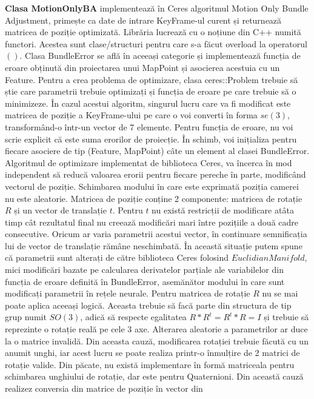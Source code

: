 \documentclass[12pt,a4paper]{report}
\begin{document}
\textbf{Clasa MotionOnlyBA} implementează în Ceres algoritmul Motion Only Bundle Adjustment,
primește ca date de intrare KeyFrame-ul curent și returnează matricea de poziție optimizată.
Librăria lucrează cu o noțiune din C++ numită functori. Acestea sunt clase/structuri pentru
care s-a făcut overload la operatorul $ () $. Clasa BundleError se află în aceeași categorie
și implementează funcția de eroare obținută din proiectarea unui MapPoint și asocierea 
acestuia cu un Feature. Pentru a crea problema de optimizare, clasa ceres::Problem trebuie 
să știe care parametrii trebuie optimizați și funcția de eroare pe care trebuie să o minimizeze.
În cazul acestui algoritm, singurul lucru care va fi modificat este matricea de poziție a KeyFrame-ului
pe care o voi converti în forma $ se(3) $, transformând-o într-un vector de 7 elemente. Pentru 
funcția de eroare, nu voi scrie explicit că este suma erorilor de proiecție. În schimb, voi inițializa pentru
fiecare asociere de tip (Feature, MapPoint) câte un element al clasei BundleError. Algoritmul de 
optimizare implementat de biblioteca Ceres, va încerca în mod independent să reducă valoarea erorii 
pentru fiecare pereche în parte, modificând vectorul de poziție. Schimbarea modului în care este 
exprimată poziția camerei nu este aleatorie. Matricea de poziție conține 2 componente:
matricea de rotație $ R $ și un vector de translație $ t $. Pentru $ t $ nu există restricții 
de modificare atâta timp cât rezultatul final nu creează modificări mari între pozițiile a două cadre
consecutive. Oricum ar varia parametrii acestui vector, în continuare semnificația
lui de vector de translație rămâne neschimbată. În această situație putem spune că parametrii 
sunt alterați de către biblioteca Ceres folosind $ EuclidianManifold $, mici modificări bazate pe
calcularea derivatelor parțiale ale variabilelor din funcția de eroare definită în BundleError, asemănător 
modului în care sunt modificați parametrii în rețele neurale. Pentru matricea de rotație $ R $ nu se 
mai poate aplica aceeași logică. Aceasta trebuie să facă parte din structura de tip grup numit 
$ SO(3) $, adică să respecte egalitatea $ R * R^t = R^t * R = I $ și trebuie să reprezinte o rotație 
reală pe cele 3 axe. Alterarea aleatorie a parametrilor ar duce la o matrice invalidă. Din aceasta
cauză, modificarea rotației trebuie făcută cu un anumit unghi,
iar acest lucru se poate realiza printr-o înmulțire de 2 matrici de rotație valide. Din păcate, nu 
există implementare în formă matriceala pentru schimbarea unghiului de rotație, dar este pentru
Quaternioni. Din această cauză realizez conversia din matrice de poziție în vector din 
\end{document}
